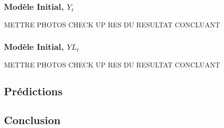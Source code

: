 \documentclass[12pt,a4paper]{book}
\newcommand{\1}{\mathds{1}}
\begin{document}
\subsubsection{Modèle Initial, $Y_t$}

METTRE PHOTOS CHECK UP RES DU RESULTAT CONCLUANT

\subsubsection{Modèle Initial, $YL_t$}

METTRE PHOTOS CHECK UP RES DU RESULTAT CONCLUANT

\vspace{5 mm}
\subsection{Prédictions}





\vspace{5 mm}
\subsection{Conclusion}
\end{document}
